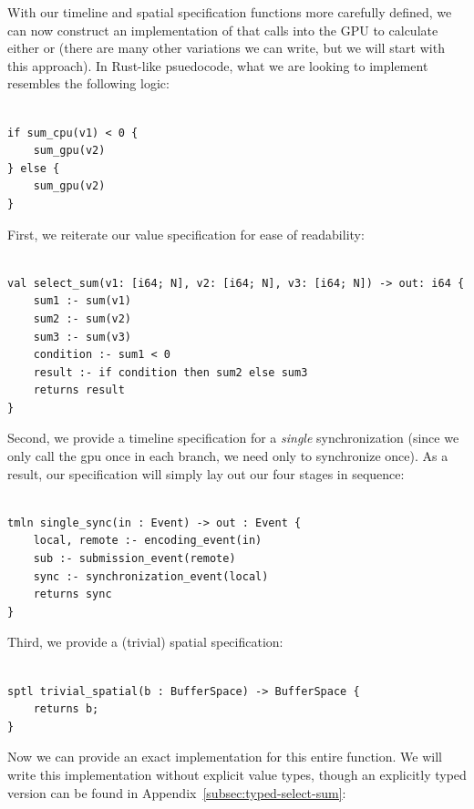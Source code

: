 With our timeline and spatial specification functions more carefully defined, we can now construct an implementation of  that calls into the GPU to calculate either  or  (there are many other variations we can write, but we will start with this approach).  In Rust-like psuedocode, what we are looking to implement resembles the following logic:
%
\begin{lstlisting}

if sum_cpu(v1) < 0 {
    sum_gpu(v2)
} else {
    sum_gpu(v2)
}
\end{lstlisting}
%
First, we reiterate our value specification for ease of readability:
%
\begin{lstlisting}

val select_sum(v1: [i64; N], v2: [i64; N], v3: [i64; N]) -> out: i64 {
    sum1 :- sum(v1)
    sum2 :- sum(v2)
    sum3 :- sum(v3)
    condition :- sum1 < 0
    result :- if condition then sum2 else sum3
    returns result
}
\end{lstlisting}
%
Second, we provide a timeline specification for a \emph{single} synchronization (since we only call the gpu once in each branch, we need only to synchronize once).  As a result, our specification will simply lay out our four stages in sequence:
%
\begin{lstlisting}

tmln single_sync(in : Event) -> out : Event {
    local, remote :- encoding_event(in)
    sub :- submission_event(remote)
    sync :- synchronization_event(local)
    returns sync
}
\end{lstlisting}
%
Third, we provide a (trivial) spatial specification:
%
\begin{lstlisting}

sptl trivial_spatial(b : BufferSpace) -> BufferSpace {
    returns b;
}
\end{lstlisting}
%
Now we can provide an exact implementation for this entire function.  We will write this implementation without explicit value types, though an explicitly typed version can be found in Appendix~\ref{subsec:typed-select-sum}:
%
